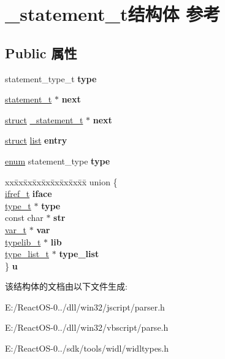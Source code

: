 \hypertarget{struct__statement__t}{}\section{\+\_\+statement\+\_\+t结构体 参考}
\label{struct__statement__t}
\subsection*{Public 属性}
\begin{DoxyCompactItemize}
\item 
\mbox{\label{struct__statement__t_a0aa7a619a600361a2f347af809073c39}} 
statement\+\_\+type\+\_\+t {\bfseries type}
\item 
\mbox{\label{struct__statement__t_a44b2b5ee69b0b18ea16bfcbf2572817b}} 
\hyperlink{struct__statement__t}{statement\+\_\+t} $\ast$ {\bfseries next}
\item 
\mbox{\label{struct__statement__t_a4693b72d29a377d838279e11b180aa40}} 
\hyperlink{interfacestruct}{struct} \hyperlink{struct__statement__t}{\+\_\+statement\+\_\+t} $\ast$ {\bfseries next}
\item 
\mbox{\label{struct__statement__t_ab6f5901667c229b49b5e06f9ca24a3d5}} 
\hyperlink{interfacestruct}{struct} \hyperlink{classlist}{list} {\bfseries entry}
\item 
\mbox{\label{struct__statement__t_a1aff08c25648e63960683191feb9481d}} 
\hyperlink{interfaceenum}{enum} statement\+\_\+type {\bfseries type}
\item 
\mbox{\label{struct__statement__t_a0546a300061b075cf0ea3495815f8be2}} 
\begin{tabbing}
xx\=xx\=xx\=xx\=xx\=xx\=xx\=xx\=xx\=\kill
union \{\\
\>\hyperlink{struct__ifref__t}{ifref\_t} {\bfseries iface}\\
\>\hyperlink{struct__type__t}{type\_t} $\ast$ {\bfseries type}\\
\>const char $\ast$ {\bfseries str}\\
\>\hyperlink{struct__var__t}{var\_t} $\ast$ {\bfseries var}\\
\>\hyperlink{struct__typelib__t}{typelib\_t} $\ast$ {\bfseries lib}\\
\>\hyperlink{struct__type__list__t}{type\_list\_t} $\ast$ {\bfseries type\_list}\\
\} {\bfseries u}\\

\end{tabbing}\end{DoxyCompactItemize}


该结构体的文档由以下文件生成\+:\begin{DoxyCompactItemize}
\item 
E\+:/\+React\+O\+S-\/0../dll/win32/jscript/parser.\+h\item 
E\+:/\+React\+O\+S-\/0../dll/win32/vbscript/parse.\+h\item 
E\+:/\+React\+O\+S-\/0../sdk/tools/widl/widltypes.\+h\end{DoxyCompactItemize}
